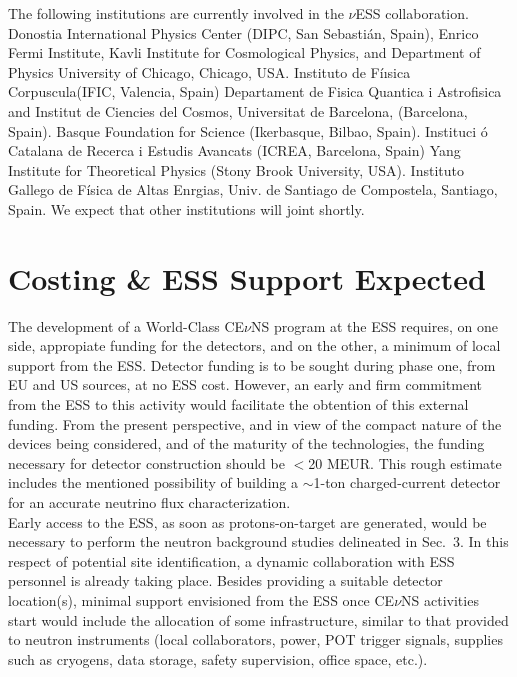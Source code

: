 \documentclass[12pt]{article}
\begin{document}
The following institutions are currently involved in the $\nu$ESS collaboration. Donostia  International  Physics  Center  (DIPC, San Sebasti\'an, Spain), Enrico  Fermi  Institute,  Kavli  Institute  for  Cosmological  Physics, and  Department  of  Physics  University  of  Chicago,  Chicago, USA. Instituto  de  F\'iısica  Corpuscula(IFIC, Valencia, Spain)  Departament  de  Fisica  Quantica  i  Astrofisica  and  Institut  de  Ciencies  del  Cosmos, Universitat  de  Barcelona, (Barcelona, Spain).  Basque  Foundation  for  Science (Ikerbasque,  Bilbao, Spain).  Instituci \'o  Catalana  de  Recerca  i  Estudis  Avancats  (ICREA, Barcelona, Spain)  Yang  Institute  for  Theoretical  Physics  (Stony  Brook  University, USA).  Instituto 
Gallego  de  F\'isica  de  Altas  Enrgias,  Univ.  de  Santiago  de  Compostela, Santiago, Spain. We expect that other institutions will joint shortly. 

\newpage

\section{Costing \& ESS Support Expected}

The development of a World-Class CE$\nu$NS program at the ESS requires, on one side, appropiate funding for the detectors, and on the other, a minimum of local support from the ESS.  Detector funding is to be sought during phase one, from EU and US sources, at no ESS cost. However, an early and firm commitment from the ESS to this activity would facilitate the obtention of this external funding. From the present perspective, and in view of the compact nature of the devices being considered, and of the maturity of the technologies, the funding necessary for detector construction should be  $<$20 MEUR. This rough estimate includes the mentioned possibility of building a $\sim$1-ton charged-current detector for an accurate neutrino flux characterization.\\

Early access to the ESS, as soon as protons-on-target are generated, would be necessary  to perform the neutron background studies delineated in Sec.\ 3. In this respect of potential site identification,  a dynamic collaboration with ESS personnel is already taking place. Besides providing a suitable detector location(s), minimal support envisioned from the ESS once CE$\nu$NS activities start would include  the allocation of some infrastructure, similar to that provided to neutron instruments (local collaborators, power, POT trigger signals, supplies such as cryogens, data storage, safety supervision, office space, etc.).
\end{document}
